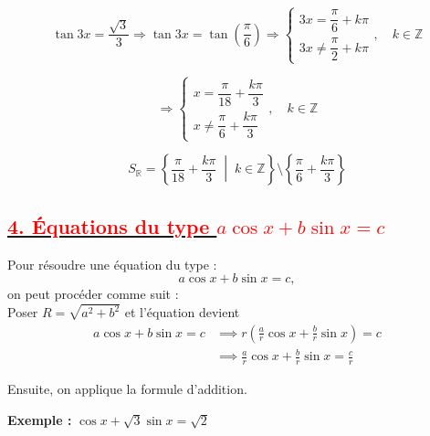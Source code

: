 \documentclass[a4paper,12pt]{article}
\begin{document}
            \[
                \tan 3x = \dfrac{\sqrt{3}}{3}
                \Rightarrow \tan 3x = \tan\left(\dfrac{\pi}{6}\right)
                \Rightarrow
                \begin{cases}
                    3x = \dfrac{\pi}{6} + k\pi \\
                    3x \neq \dfrac{\pi}{2} + k\pi
                \end{cases},\quad k \in \mathbb{Z}
            \]

            \[
                \Rightarrow
                \begin{cases}
                    x = \dfrac{\pi}{18} + \dfrac{k\pi}{3} \\
                    x \neq \dfrac{\pi}{6} + \dfrac{k\pi}{3}
                \end{cases},\quad k \in \mathbb{Z}
            \]

            \[
                \boxed{
                    S_{\mathbb{R}} = \left\{ \dfrac{\pi}{18} + \dfrac{k\pi}{3} \;\middle|\; k \in \mathbb{Z} \right\}
                    \setminus
                    \left\{ \dfrac{\pi}{6} + \dfrac{k\pi}{3} \right\}
                }
            \]

            \subsection*{\underline{\textcolor{red}{4. Équations du type $a\cos x + b\sin x = c$}}}

            \noindent
            Pour résoudre une équation du type :
            \[
                a\cos x + b\sin x = c,
            \]
            on peut procéder comme suit :\\

            Poser \( R = \sqrt{a^2 + b^2} \) et l’équation devient
            \[
                \begin{aligned}
                    a\cos x + b\sin x = c & \implies r\left( \frac{a}{r}\cos x + \frac{b}{r}\sin x \right) = c \\
                                          & \implies\frac{a}{r}\cos x + \frac{b}{r}\sin x = \frac{c}{r}
                \end{aligned}
            \]

            \noindent
            Ensuite, on applique la formule d’addition.

            \textbf{Exemple :} $ \cos x + \sqrt{3} \sin x = \sqrt{2} $
\end{document}
